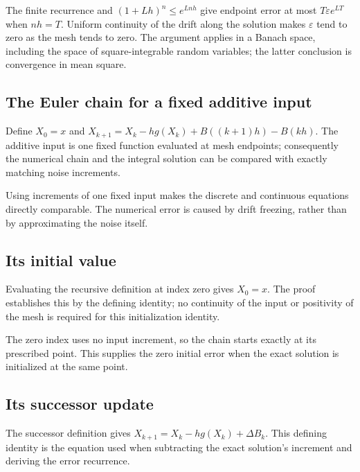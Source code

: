 \documentclass[11pt,a4paper]{report}
\begin{document}
The finite recurrence and \((1+Lh)^n\le e^{Lnh}\) give endpoint error at most \(T\varepsilon e^{LT}\) when \(nh=T\). Uniform continuity of the drift along the solution makes \(\varepsilon\) tend to zero as the mesh tends to zero. The argument applies in a Banach space, including the space of square-integrable random variables; the latter conclusion is convergence in mean square.

\subsection{\texorpdfstring{The Euler chain for a fixed additive input}{The Euler chain for a fixed additive input}}
\label{report-step-UnadjustedLangevin-EulerLimit-lean-1}


Define \(X_0=x\) and \(X_{k+1}=X_k-hg(X_k)+B((k+1)h)-B(kh)\). The additive input is one fixed function evaluated at mesh endpoints; consequently the numerical chain and the integral solution can be compared with exactly matching noise increments.



Using increments of one fixed input makes the discrete and continuous equations directly comparable. The numerical error is caused by drift freezing, rather than by approximating the noise itself.

\subsection{\texorpdfstring{Its initial value}{Its initial value}}
\label{report-step-UnadjustedLangevin-EulerLimit-lean-2}


Evaluating the recursive definition at index zero gives \(X_0=x\). The proof establishes this by the defining identity; no continuity of the input or positivity of the mesh is required for this initialization identity.



The zero index uses no input increment, so the chain starts exactly at its prescribed point. This supplies the zero initial error when the exact solution is initialized at the same point.

\subsection{\texorpdfstring{Its successor update}{Its successor update}}
\label{report-step-UnadjustedLangevin-EulerLimit-lean-3}


The successor definition gives \(X_{k+1}=X_k-hg(X_k)+\Delta B_k\). This defining identity is the equation used when subtracting the exact solution's increment and deriving the error recurrence.
\end{document}
